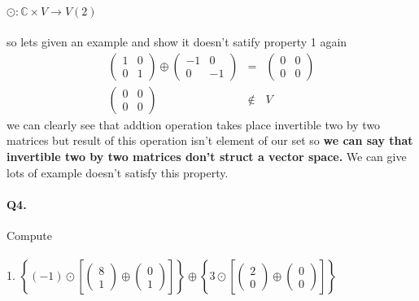 \documentclass[11pt]{article}
\newcommand{\C}{\mathbb{C}}
\begin{document}
\paragraph{}$\odot : \C \times V \rightarrow V (2)$
\\
\\
so lets given an example and show it doesn't satify property 1 again
\begin{eqnarray*}
\begin{pmatrix}
1 & 0\\
0 & 1
\end{pmatrix}
\oplus
\begin{pmatrix}
-1 & 0\\
0 & -1
\end{pmatrix}
&=&
\begin{pmatrix}
0 & 0\\
0 & 0
\end{pmatrix}
\\ \begin{pmatrix}
0 & 0\\
0 & 0
\end{pmatrix} & \notin & V
\end{eqnarray*}
we can clearly see that addtion operation takes place invertible two by two matrices but result of this operation isn't element of our set so \textbf{ we can say that invertible two by two matrices don't struct a vector space.} We can give lots of example doesn't satisfy this property.

\paragraph{Q4.}Compute
\paragraph{}1.
$
\left\{
(-1) \odot
\left[
\begin{pmatrix}
8\\
1
\end{pmatrix}
\oplus
\begin{pmatrix}
0\\
1
\end{pmatrix}
\right]
\right\}
\oplus
\left\{
3
\odot
\left[
\begin{pmatrix}
2\\
0
\end{pmatrix}
\oplus
\begin{pmatrix}
0\\
0
\end{pmatrix}
\right]
\right\}
$
\end{document}
